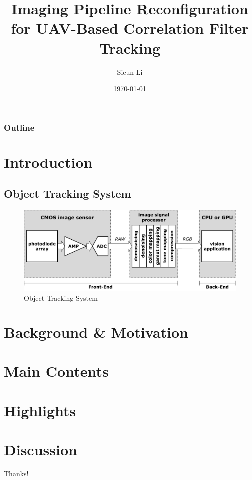 \documentclass{beamer}
\author{Sicun Li}
\title{Imaging Pipeline Reconfiguration for UAV-Based Correlation Filter Tracking}
\institute{School of Microelectronics}
\date{\today}
\begin{document}
\begin{frame}
    \titlepage
\end{frame}

\begin{frame}
    \frametitle{Outline}
    \tableofcontents[sectionstyle=show,subsectionstyle=show/shaded/hide,subsubsectionstyle=show/shaded/hide]
\end{frame}

\section{Introduction}

\subsection{Object Tracking System}

\begin{frame}
    \begin{figure}[htpb]
        \begin{center}
            \includegraphics[width=1.0\linewidth]{fig/block.pdf}
            \caption{Object Tracking System}
        \end{center}
    \end{figure}
\end{frame}

\section{Background \& Motivation}

\section{Main Contents}

\section{Highlights}

\section{Discussion}

\begin{frame}
    \begin{center}
        {\Huge\calligra Thanks!}
    \end{center}
\end{frame}
\end{document}
